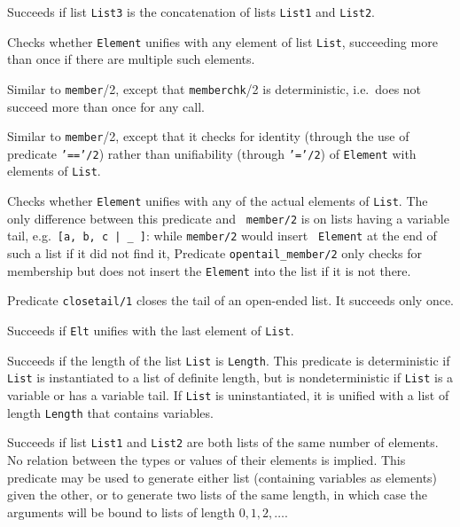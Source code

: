 \begin{description}
    Succeeds if list {\tt List3} is the concatenation of lists 
    {\tt List1} and {\tt List2}.

    Checks whether {\tt Element} unifies with any element of list 
    {\tt List}, succeeding more than once if there are multiple 
    such elements.

    Similar to {\tt member}/2, except that {\tt memberchk}/2 is
    deterministic, i.e.\ does not succeed more than once for any call.

    Similar to {\tt member}/2, except that it checks for identity
    (through the use of predicate {\tt '=='/2}) rather than unifiability 
    (through {\tt '='/2}) of {\tt Element} with elements of {\tt List}.

%
Checks whether {\tt Element} unifies with any of the actual elements
of {\tt List}.  The only difference between this predicate and {\tt
  member/2} is on lists having a variable tail,
e.g.\ \verb'[a, b, c | _ ]': while {\tt member/2} would insert {\tt
  Element} at the end of such a list if it did not find it, Predicate
{\tt opentail\_member/2} only checks for membership but does not insert the
{\tt Element} into the list if it is not there.

    Predicate {\tt closetail/1} closes the tail of an open-ended list.
    It succeeds only once.

%
Succeeds if {\tt Elt} unifies with the last element of {\tt List}.

    Succeeds if the length of the list {\tt List} is {\tt Length}.
    This predicate is deterministic if {\tt List} is instantiated 
    to a list of definite length, but is nondeterministic if 
    {\tt List} is a variable or has a variable tail.  If {\tt List}
    is uninstantiated, it is unified with a list of length {\tt Length}
    that contains variables.

    Succeeds if list {\tt List1} and {\tt List2} are both lists of
    the same number of elements.  No relation between the types or
    values of their elements is implied.  This predicate may be used
    to generate either list (containing variables as elements) given
    the other, or to generate two lists of the same length, in which
    case the arguments will be bound to lists of length $0,1,2,\ldots$.


\end{description}

